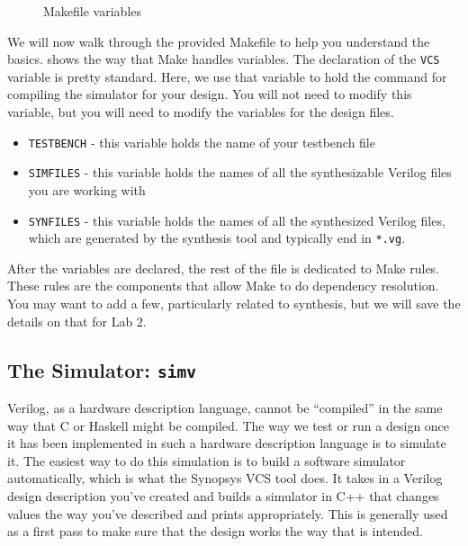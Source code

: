 \documentclass[dvipsnames]{article}
\begin{document}
\begin{figure}[H]
	\inputminted[frame=lines,obeytabs,tabsize=4,firstline=15,lastline=15]{makefile}{Makefile}
	\inputminted[frame=lines,obeytabs,tabsize=4,firstline=25,lastline=27]{makefile}{Makefile}
	\caption{Makefile variables}
	\label{fig:makevar}
\end{figure}

We will now walk through the provided Makefile to help you understand the
basics.  shows the way that Make handles variables. The
declaration of the \texttt{VCS} variable is pretty standard. Here, we use that
variable to hold the command for compiling the simulator for your design. You
will not need to modify this variable, but you will need to modify the variables
for the design files. 


\begin{itemize}
	\item \texttt{TESTBENCH} - this variable holds the name of your testbench 
		file
	\item \texttt{SIMFILES} - this variable holds the names of all the
		synthesizable Verilog files you are working with
	\item \texttt{SYNFILES} - this variable holds the names of all the 
		synthesized Verilog files, which are generated by the synthesis tool and
		typically end in \texttt{*.vg}.
\end{itemize}

After the variables are declared, the rest of the file is dedicated to Make 
rules. These rules are the components that allow Make to do dependency
resolution. You may want to add a few, particularly related to synthesis, but we
will save the details on that for Lab 2.

\subsection{The Simulator: \texttt{simv}}
Verilog, as a hardware description language, cannot be ``compiled'' in the same
way that C or Haskell might be compiled. The way we test or run a design once it
has been implemented in such a hardware description language is to simulate it.
The easiest way to do this simulation is to build a software simulator
automatically, which is what the Synopsys VCS tool does. It takes in a Verilog
design description you've created and builds a simulator in C++ that changes 
values the way you've described and prints appropriately. This is generally used
as a first pass to make sure that the design works the way that is intended. 
\end{document}
